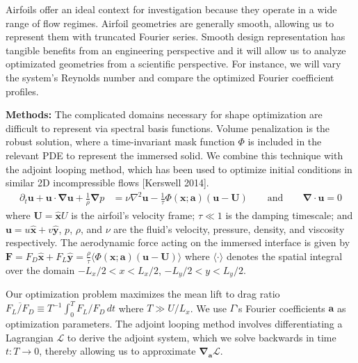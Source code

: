 \documentclass[11pt]{article}
\renewcommand{\vec}[1]{\boldsymbol{#1}}
\newcommand{\grad}{\vec{\nabla}}
\newcommand{\laplacian}{\nabla^2}
\begin{document}
Airfoils offer an ideal context for investigation because they operate in a wide range of flow regimes. Airfoil geometries are generally smooth, allowing us to represent them with truncated Fourier series. Smooth design representation has tangible benefits from an engineering perspective and it will allow us to analyze optimizated geometries from a scientific perspective. For instance, we will vary the system's Reynolds number and compare the optimized Fourier coefficient profiles.


\textbf{Methods:} The complicated domains necessary for shape optimization are difficult to represent via spectral basis functions. 
Volume penalization is the robust solution, where a time-invariant mask function $\Phi$ is included in the relevant PDE to represent the immersed solid. We combine this technique with the adjoint looping method, which has been used to optimize initial conditions in similar 2D incompressible flows [Kerswell 2014].
\begin{align}
  \partial_t \vec{u} + \vec{u}\cdot\grad\vec{u} + \frac{1}{\rho}\grad p &= \nu\laplacian\vec{u} - \frac{1}{\tau}\Phi(\vec{x};\vec{a})(\vec{u} - \vec{U}) \qquad \text{and} \qquad \grad \cdot \vec{u} = 0 \label{eq:ns}
\end{align}
where $\vec{U} = \vec{\hat{x}}U$ is the airfoil's velocity frame; $\tau \ll 1$ is the damping timescale; and $\vec{u} = u\vec{\hat{x}} + v\vec{\hat{y}}$, $p$, $\rho$, and $\nu$ are the fluid's velocity, pressure, density, and viscosity respectively.
The aerodynamic force acting on the immersed interface is given by $\vec{F} = F_D\hat{\vec{x}} + F_L\hat{\vec{y}} = \frac{\rho}{\tau}\langle \Phi(\vec{x};\vec{a}) (\vec{u} - \vec{U}) \rangle$
where $\langle \cdot \rangle$ denotes the spatial integral over the domain $-L_x/2<x<L_x/2$, $-L_y/2<y<L_y/2$.

Our optimization problem maximizes the mean lift to drag ratio $\overline{{F}_L / F_D} \equiv T^{-1}\int_0^T F_L / F_D\,dt$ where $T \gg U/L_x$.
We use $\Gamma$'s Fourier coefficients $\vec{a}$ as optimization parameters. The adjoint looping method involves differentiating a Lagrangian $\mathcal{L}$ to derive the adjoint system, which we solve backwards in time $t:T\to0$, thereby allowing us to approximate $\grad_{\vec{a}}\mathcal{L}$.
\end{document}
